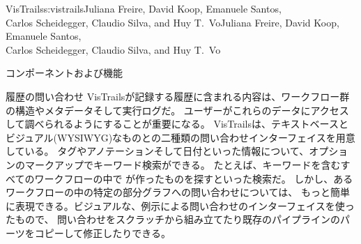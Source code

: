 \begin{aosachaptertoc}{VisTrails}{s:vistrails}{Juliana Freire, David Koop, Emanuele Santos, \\ Carlos Scheidegger, Claudio Silva, and Huy T.\ Vo}{Juliana Freire, David Koop, Emanuele Santos, \\ \hspace*{0.9cm} Carlos Scheidegger, Claudio Silva, and Huy T.\ Vo}
\begin{aosasect1}{コンポーネントおよび機能}
\begin{aosasect2}{履歴の問い合わせ}
VisTrailsが記録する履歴に含まれる内容は、ワークフロー群の構造やメタデータそして実行ログだ。
ユーザーがこれらのデータにアクセスして調べられるようにすることが重要になる。
VisTrailsは、テキストベースとビジュアル(WYSIWYG)なものとの二種類の問い合わせインターフェイスを用意している。
タグやアノテーションそして日付といった情報について、オプションのマークアップでキーワード検索ができる。
たとえば、キーワードを含むすべてのワークフローの中で
が作ったものを探すといった検索だ。
しかし、あるワークフローの中の特定の部分グラフへの問い合わせについては、
もっと簡単に表現できる。ビジュアルな、例示による問い合わせのインターフェイスを使ったもので、
問い合わせをスクラッチから組み立てたり既存のパイプラインのパーツをコピーして修正したりできる。


\end{aosasect2}
\end{aosasect1}
\end{aosachaptertoc}
